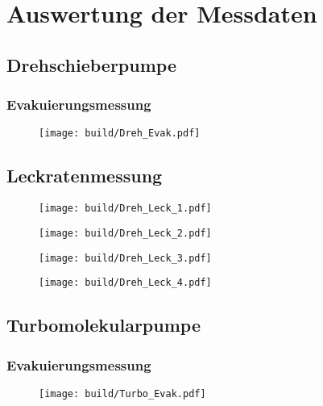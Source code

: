 \section{Auswertung der Messdaten}
\label{sec:Auswertung}
\subsection{Drehschieberpumpe}
\subsubsection{Evakuierungsmessung}
\begin{figure}[H]
    \centering
    \texttt{[image: build/Dreh\_Evak.pdf]}
    \caption{}
    \label{fig:dreh_evak}
\end{figure}
\noindent
\subsection{Leckratenmessung}
\begin{figure}[H]
    \centering
    \texttt{[image: build/Dreh\_Leck\_1.pdf]}
    \caption{}
    \label{fig:dreh_leck1}
\end{figure}
\noindent
\begin{figure}[H]
    \centering
    \texttt{[image: build/Dreh\_Leck\_2.pdf]}
    \caption{}
    \label{fig:dreh_leck2}
\end{figure}
\noindent
\begin{figure}[H]
    \centering
    \texttt{[image: build/Dreh\_Leck\_3.pdf]}
    \caption{}
    \label{fig:dreh_leck3}
\end{figure}
\noindent
\begin{figure}[H]
    \centering
    \texttt{[image: build/Dreh\_Leck\_4.pdf]}
    \caption{}
    \label{fig:dreh_leck4}
\end{figure}
\noindent
\subsection{Turbomolekularpumpe}
\subsubsection{Evakuierungsmessung}
\begin{figure}[H]
    \centering
    \texttt{[image: build/Turbo\_Evak.pdf]}
    \caption{}
    \label{fig:turbo_evak}
\end{figure}
\noindent
